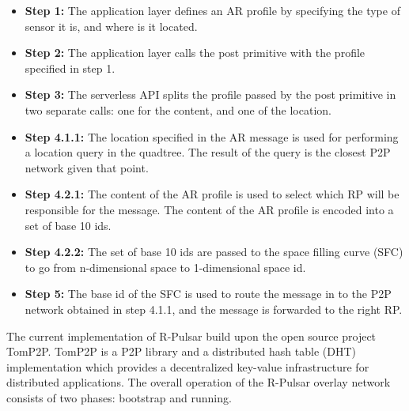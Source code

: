 \begin{itemize}
    \item \textbf{Step 1:} The application layer defines an AR profile by specifying the type of sensor it is, and where is it located.
    
    \item \textbf{Step 2:} The application layer calls the post primitive with the profile specified in step 1.
    
    \item \textbf{Step 3:} The serverless API splits the profile passed by the post primitive in two separate calls: one for the content, and one of the location.
    
    \item \textbf{Step 4.1.1:} The location specified in the AR message is used for performing a location query in the quadtree. The result of the query is the closest P2P network given that point.
    
    \item \textbf{Step 4.2.1:} The content of the AR profile is used to select which RP will be responsible for the message. The content of the AR profile is encoded into a set of base 10 ids.
    
    \item \textbf{Step 4.2.2:} The set of base 10 ids are passed to the space filling curve (SFC) to go from n-dimensional space to 1-dimensional space id.
    
    \item \textbf{Step 5:} The base id of the SFC is used to route the message in to the P2P network obtained in step 4.1.1, and the message is forwarded to the right RP.
\end{itemize}


\noindent The current implementation of R-Pulsar build upon the open source project TomP2P. TomP2P is a P2P library and a distributed hash table (DHT) implementation which provides a decentralized key-value infrastructure for distributed applications. The overall operation of the R-Pulsar overlay network consists of two phases: bootstrap and running.

